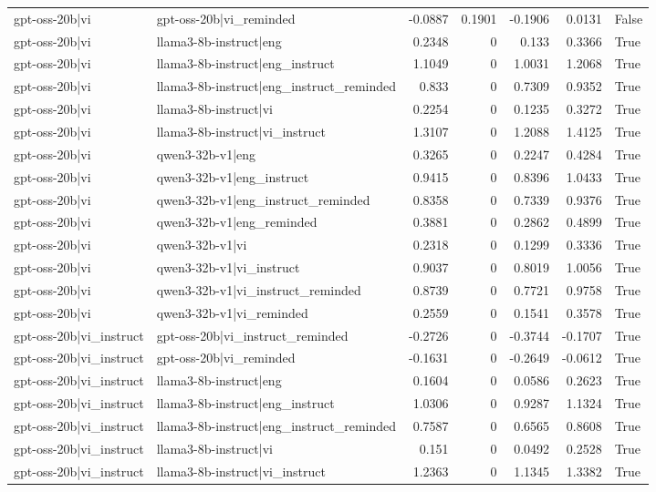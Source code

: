 \begin{table}
\begin{tabular}{l l r r r r l}
gpt-oss-20b|vi & gpt-oss-20b|vi_reminded & -0.0887 & 0.1901 & -0.1906 & 0.0131 & False \\
gpt-oss-20b|vi & llama3-8b-instruct|eng & 0.2348 & 0 & 0.133 & 0.3366 & True \\
gpt-oss-20b|vi & llama3-8b-instruct|eng_instruct & 1.1049 & 0 & 1.0031 & 1.2068 & True \\
gpt-oss-20b|vi & llama3-8b-instruct|eng_instruct_reminded & 0.833 & 0 & 0.7309 & 0.9352 & True \\
gpt-oss-20b|vi & llama3-8b-instruct|vi & 0.2254 & 0 & 0.1235 & 0.3272 & True \\
gpt-oss-20b|vi & llama3-8b-instruct|vi_instruct & 1.3107 & 0 & 1.2088 & 1.4125 & True \\
gpt-oss-20b|vi & qwen3-32b-v1|eng & 0.3265 & 0 & 0.2247 & 0.4284 & True \\
gpt-oss-20b|vi & qwen3-32b-v1|eng_instruct & 0.9415 & 0 & 0.8396 & 1.0433 & True \\
gpt-oss-20b|vi & qwen3-32b-v1|eng_instruct_reminded & 0.8358 & 0 & 0.7339 & 0.9376 & True \\
gpt-oss-20b|vi & qwen3-32b-v1|eng_reminded & 0.3881 & 0 & 0.2862 & 0.4899 & True \\
gpt-oss-20b|vi & qwen3-32b-v1|vi & 0.2318 & 0 & 0.1299 & 0.3336 & True \\
gpt-oss-20b|vi & qwen3-32b-v1|vi_instruct & 0.9037 & 0 & 0.8019 & 1.0056 & True \\
gpt-oss-20b|vi & qwen3-32b-v1|vi_instruct_reminded & 0.8739 & 0 & 0.7721 & 0.9758 & True \\
gpt-oss-20b|vi & qwen3-32b-v1|vi_reminded & 0.2559 & 0 & 0.1541 & 0.3578 & True \\
gpt-oss-20b|vi_instruct & gpt-oss-20b|vi_instruct_reminded & -0.2726 & 0 & -0.3744 & -0.1707 & True \\
gpt-oss-20b|vi_instruct & gpt-oss-20b|vi_reminded & -0.1631 & 0 & -0.2649 & -0.0612 & True \\
gpt-oss-20b|vi_instruct & llama3-8b-instruct|eng & 0.1604 & 0 & 0.0586 & 0.2623 & True \\
gpt-oss-20b|vi_instruct & llama3-8b-instruct|eng_instruct & 1.0306 & 0 & 0.9287 & 1.1324 & True \\
gpt-oss-20b|vi_instruct & llama3-8b-instruct|eng_instruct_reminded & 0.7587 & 0 & 0.6565 & 0.8608 & True \\
gpt-oss-20b|vi_instruct & llama3-8b-instruct|vi & 0.151 & 0 & 0.0492 & 0.2528 & True \\
gpt-oss-20b|vi_instruct & llama3-8b-instruct|vi_instruct & 1.2363 & 0 & 1.1345 & 1.3382 & True \\

\end{tabular}
\end{table}
